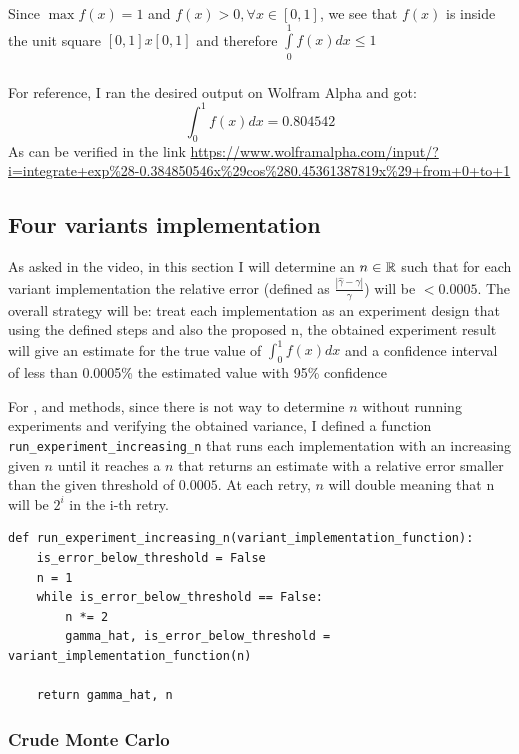 \documentclass{homework}
\begin{document}
Since $\max f(x) = 1$ and $f(x) > 0, \forall x \in [0, 1]$, we see that $f(x)$ is inside the unit square $[0, 1]x[0, 1]$ and therefore $\int\limits_0^1 f(x) dx\leq 1$

\subsubsection{}
For reference, I ran the desired output on Wolfram Alpha and got:
\begin{equation}
    \int_0^1 f(x)dx = 0.804542
\end{equation}
As can be verified in the link  \url{https://www.wolframalpha.com/input/?i=integrate+exp%28-0.384850546x%29cos%280.45361387819x%29+from+0+to+1}

\subsection {Four variants implementation} 

As asked in the video, in this section I will determine an $n \in \mathbb R$ such that for each variant implementation the relative error (defined as $\frac{|\hat\gamma - \gamma |}{\gamma}$) will be $< 0.0005$.
The overall strategy will be: treat each implementation as an experiment design that using the defined steps and also the proposed n, the obtained experiment result will give an estimate for the true value of $\int_0^1 f(x)dx$ and a confidence interval of less than 0.0005\% the estimated value with 95\% confidence

For ,  and  methods, since there is not way to determine $n$ without running experiments and verifying the obtained variance, I defined a function \verb|run_experiment_increasing_n| that runs each implementation with an increasing given $n$ until it reaches a $n$ that returns an estimate with a relative error smaller than the given threshold of $0.0005$. At each retry, $n$ will double meaning that n will be $2^i$ in the i-th retry.

\begin{lstlisting}
def run_experiment_increasing_n(variant_implementation_function):
	is_error_below_threshold = False
	n = 1
	while is_error_below_threshold == False:
		n *= 2
		gamma_hat, is_error_below_threshold = variant_implementation_function(n)

	return gamma_hat, n
\end{lstlisting}

\subsubsection{Crude Monte Carlo}
\end{document}
